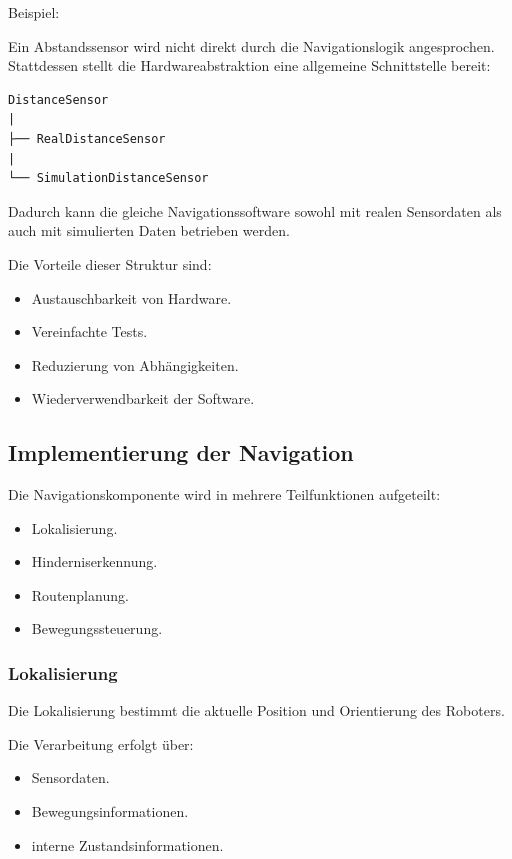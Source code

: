 \documentclass[
  a4paper,
  12pt,
  DIV=12,        %
  parskip=half,  %
  headings=small %
]{scrartcl}
\theoremstyle{definition}
\providecommand{\tightlist}{%
  \setlength{\itemsep}{0pt}\setlength{\parskip}{0pt}}
\theoremstyle{definition}
\begin{document}
Beispiel:

Ein Abstandssensor wird nicht direkt durch die Navigationslogik
angesprochen. Stattdessen stellt die Hardwareabstraktion eine allgemeine
Schnittstelle bereit:

\begin{verbatim}
DistanceSensor
|
├── RealDistanceSensor
|
└── SimulationDistanceSensor
\end{verbatim}

Dadurch kann die gleiche Navigationssoftware sowohl mit realen
Sensordaten als auch mit simulierten Daten betrieben werden.

Die Vorteile dieser Struktur sind:

\begin{itemize}
\tightlist
\item
  Austauschbarkeit von Hardware.
\item
  Vereinfachte Tests.
\item
  Reduzierung von Abhängigkeiten.
\item
  Wiederverwendbarkeit der Software.
\end{itemize}

\subsection{Implementierung der
Navigation}\label{implementierung-der-navigation}

Die Navigationskomponente wird in mehrere Teilfunktionen aufgeteilt:

\begin{itemize}
\tightlist
\item
  Lokalisierung.
\item
  Hinderniserkennung.
\item
  Routenplanung.
\item
  Bewegungssteuerung.
\end{itemize}

\subsubsection{Lokalisierung}\label{lokalisierung}

Die Lokalisierung bestimmt die aktuelle Position und Orientierung des
Roboters.

Die Verarbeitung erfolgt über:

\begin{itemize}
\tightlist
\item
  Sensordaten.
\item
  Bewegungsinformationen.
\item
  interne Zustandsinformationen.
\end{itemize}
\end{document}
